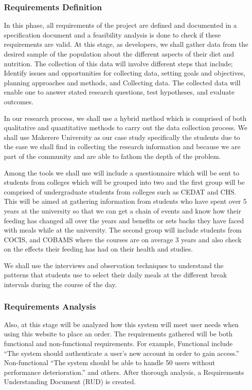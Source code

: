 \documentclass{article}
\begin{document}
\subsubsection{Requirements Definition}
In this phase, all requirements of the project are defined and documented in a specification document and a feasibility analysis is done to check if these requirements are valid. At this stage, as developers, we shall gather data from the desired sample of the population about the different aspects of their diet and nutrition. The collection of this data will involve different steps that include; Identify issues and opportunities for collecting data, setting goals and objectives, planning approaches and methods, and Collecting data. The collected data will enable one to answer stated research questions, test hypotheses, and evaluate outcomes.

In our research process, we shall use a hybrid method which is comprised of both qualitative and quantitative methods to carry out the data collection process. We shall use Makerere University as our case study specifically the students due to the ease we shall find in collecting the research information and because we are part of the community and are able to fathom the depth of the problem.   

Among the tools we shall use will include a questionnaire which will be sent to students from colleges which will be grouped into two and the first group will be comprised of undergraduate students from colleges such as CEDAT and CHS. This will be aimed at gathering information from students who have spent over 5 years at the university so that we can get a chain of events and know how their feeding has changed all over the years and benefits or sets backs they have faced with meals while at the university. The second group will include students from COCIS,  and COBAMS where the courses are on average 3 years and also check on the effects their feeding has had on their health and studies. 

We shall use the interviews and observation techniques to understand the patterns that students use to select their daily meals at the different break intervals during the course of the day.

\subsubsection{Requirements Analysis}
Also, at this stage will be analyzed how this system will meet user needs when using this website to place an order. The requirements gathered will be both functional and non-functional requirements. For example, Functional include “The system should authenticate a user’s new account in order to gain access.” Non-functional “The system should be able to handle 50 users without performance deterioration.” and others. After thorough analysis, a Requirements Understanding Document (RUD) is created.
\end{document}
